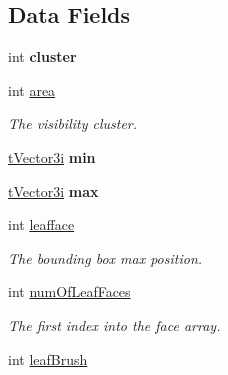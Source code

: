 \subsection*{Data Fields}
\begin{DoxyCompactItemize}
\item 
int {\bfseries cluster}\hypertarget{structt_b_s_p_leaf_a614d113d96578e86c84eac1e5da30964}{}\label{structt_b_s_p_leaf_a614d113d96578e86c84eac1e5da30964}

\item 
int \hyperlink{structt_b_s_p_leaf_a42134f4980e2596e91aad36318392178}{area}\hypertarget{structt_b_s_p_leaf_a42134f4980e2596e91aad36318392178}{}\label{structt_b_s_p_leaf_a42134f4980e2596e91aad36318392178}

\begin{DoxyCompactList}\small\item\em The visibility cluster. \end{DoxyCompactList}\item 
\hyperlink{structt_vector3i}{t\+Vector3i} {\bfseries min}\hypertarget{structt_b_s_p_leaf_a54bc50d07dee43f58e07113c22ef9bc5}{}\label{structt_b_s_p_leaf_a54bc50d07dee43f58e07113c22ef9bc5}

\item 
\hyperlink{structt_vector3i}{t\+Vector3i} {\bfseries max}\hypertarget{structt_b_s_p_leaf_ad948f5ec602fe6374e579ebecdca32b9}{}\label{structt_b_s_p_leaf_ad948f5ec602fe6374e579ebecdca32b9}

\item 
int \hyperlink{structt_b_s_p_leaf_ae511900fc2a0644237f91bf87c54fec4}{leafface}\hypertarget{structt_b_s_p_leaf_ae511900fc2a0644237f91bf87c54fec4}{}\label{structt_b_s_p_leaf_ae511900fc2a0644237f91bf87c54fec4}

\begin{DoxyCompactList}\small\item\em The bounding box max position. \end{DoxyCompactList}\item 
int \hyperlink{structt_b_s_p_leaf_af9c931abae0ae1c714c263d6f360cf80}{num\+Of\+Leaf\+Faces}\hypertarget{structt_b_s_p_leaf_af9c931abae0ae1c714c263d6f360cf80}{}\label{structt_b_s_p_leaf_af9c931abae0ae1c714c263d6f360cf80}

\begin{DoxyCompactList}\small\item\em The first index into the face array. \end{DoxyCompactList}\item 
int \hyperlink{structt_b_s_p_leaf_ae33ecb631834c42ef3fc222e6964d0b9}{leaf\+Brush}\hypertarget{structt_b_s_p_leaf_ae33ecb631834c42ef3fc222e6964d0b9}{}\label{structt_b_s_p_leaf_ae33ecb631834c42ef3fc222e6964d0b9}


\end{DoxyCompactItemize}
